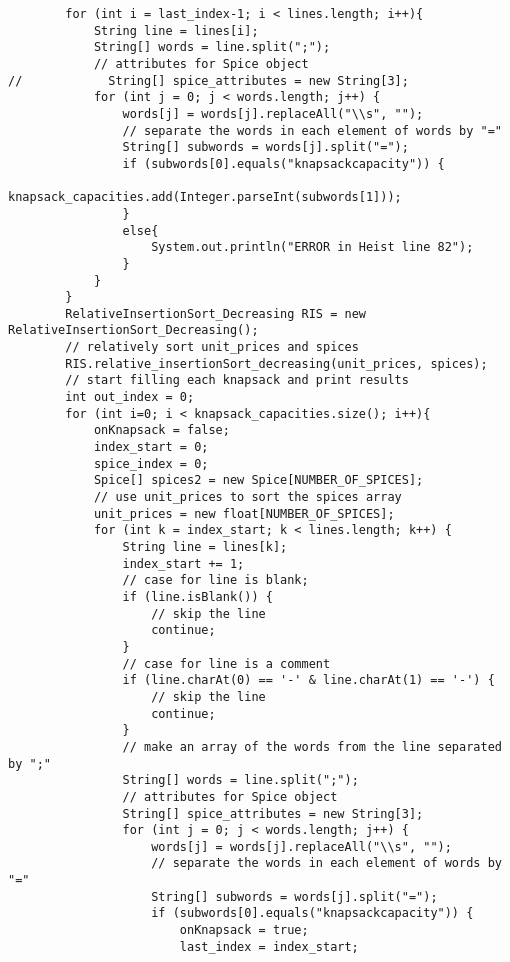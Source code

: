 \documentclass{article}
\begin{document}
\begin{lstlisting}
        for (int i = last_index-1; i < lines.length; i++){
            String line = lines[i];
            String[] words = line.split(";");
            // attributes for Spice object
//            String[] spice_attributes = new String[3];
            for (int j = 0; j < words.length; j++) {
                words[j] = words[j].replaceAll("\\s", "");
                // separate the words in each element of words by "="
                String[] subwords = words[j].split("=");
                if (subwords[0].equals("knapsackcapacity")) {
                    knapsack_capacities.add(Integer.parseInt(subwords[1]));
                }
                else{
                    System.out.println("ERROR in Heist line 82");
                }
            }
        }
        RelativeInsertionSort_Decreasing RIS = new RelativeInsertionSort_Decreasing();
        // relatively sort unit_prices and spices
        RIS.relative_insertionSort_decreasing(unit_prices, spices);
        // start filling each knapsack and print results
        int out_index = 0;
        for (int i=0; i < knapsack_capacities.size(); i++){
            onKnapsack = false;
            index_start = 0;
            spice_index = 0;
            Spice[] spices2 = new Spice[NUMBER_OF_SPICES];
            // use unit_prices to sort the spices array
            unit_prices = new float[NUMBER_OF_SPICES];
            for (int k = index_start; k < lines.length; k++) {
                String line = lines[k];
                index_start += 1;
                // case for line is blank;
                if (line.isBlank()) {
                    // skip the line
                    continue;
                }
                // case for line is a comment
                if (line.charAt(0) == '-' & line.charAt(1) == '-') {
                    // skip the line
                    continue;
                }
                // make an array of the words from the line separated by ";"
                String[] words = line.split(";");
                // attributes for Spice object
                String[] spice_attributes = new String[3];
                for (int j = 0; j < words.length; j++) {
                    words[j] = words[j].replaceAll("\\s", "");
                    // separate the words in each element of words by "="
                    String[] subwords = words[j].split("=");
                    if (subwords[0].equals("knapsackcapacity")) {
                        onKnapsack = true;
                        last_index = index_start;

\end{lstlisting}
\end{document}
